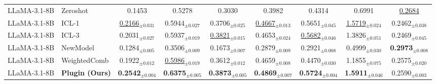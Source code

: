 \begin{table*}[t]
{\begin{tabular}{|llccccccc|}
        LLaMA-3.1-8B & Zeroshot & 0.1453 & 0.5278 & 0.3030 & 0.3982 & 0.4314 & 0.6991 & \underline{0.2684}\\
        LLaMA-3.1-8B & ICL-1 & \underline{0.2166}$_{\pm0.031}$ & 0.5944$_{\pm0.027}$ & 0.3706$_{\pm0.025}$ & \underline{0.4667}$_{\pm0.013}$ & 0.5651$_{\pm0.045}$ & \underline{1.5719}$_{\pm0.024}$ & 0.2462$_{\pm0.038}$\\
        LLaMA-3.1-8B & ICL-3 & 0.2031$_{\pm0.027}$ & 0.5937$_{\pm0.019}$ & \underline{0.3821}$_{\pm0.015}$ & 0.4653$_{\pm0.024}$ & \underline{0.5682}$_{\pm0.046}$ & 1.3826$_{\pm0.051}$ & 0.2469$_{\pm0.045}$\\
        LLaMA-3.1-8B & NewModel & 0.1284$_{\pm0.005}$ & 0.3506$_{\pm0.009}$ & 0.1673$_{\pm0.007}$ & 0.2879$_{\pm0.009}$ & 0.2921$_{\pm0.008}$ & 0.4999$_{\pm0.030}$ & \textbf{0.2973}$_{\pm0.008}$\\
        LLaMA-3.1-8B & WeightedComb & 0.1922$_{\pm0.012}$ & \underline{0.5986}$_{\pm0.019}$ & 0.3612$_{\pm0.012}$ & 0.4659$_{\pm0.008}$ & 0.4470$_{\pm0.030}$ & 1.1855$_{\pm0.075}$ & 0.2575$_{\pm0.020}$\\
        LLaMA-3.1-8B & \textbf{Plugin (Ours)} & \textbf{0.2542}$_{\pm0.004}$ & \textbf{0.6375}$_{\pm0.005}$ & \textbf{0.3873}$_{\pm0.005}$ & \textbf{0.4869}$_{\pm0.007}$ & \textbf{0.5724}$_{\pm0.004}$ & \textbf{1.5911}$_{\pm0.046}$ & 0.2590$_{\pm0.003}$\\
        \hline
    \end{tabular}
    }
        \vspace{-3mm}

\end{table*}

